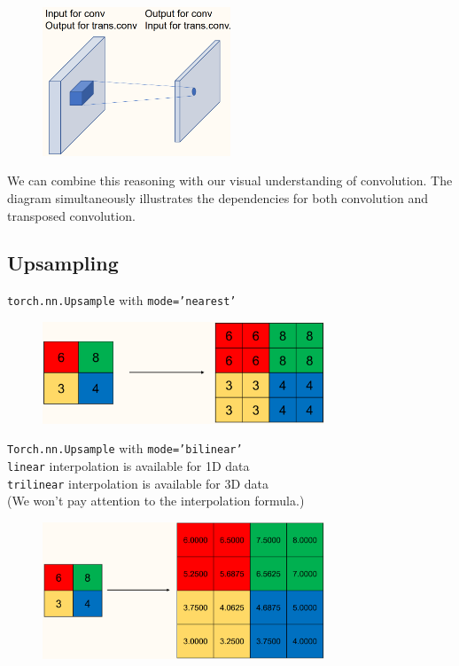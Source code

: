 \documentclass{report}
\begin{document}
\begin{figure}[H]
    \centering
    \includegraphics[width=0.5\textwidth]{.././assets/8.17.png}
\end{figure}

We can combine this reasoning with our visual understanding of convolution. The diagram simultaneously illustrates the dependencies for both convolution and transposed convolution.

\subsection{Upsampling}

\begin{concept}[8.17][Upsampling]
    \texttt{torch.nn.Upsample} with \texttt{mode='nearest'}

    \begin{figure}[H]
        \centering
        \includegraphics[width=0.75\textwidth]{.././assets/8.18.png}
    \end{figure}
\end{concept}

\begin{concept}[8.18][Upsampling]
    \texttt{Torch.nn.Upsample} with \texttt{mode='bilinear'}\\
    \texttt{linear} interpolation is available for 1D data\\
    \texttt{trilinear} interpolation is available for 3D data\\
    (We won't pay attention to the interpolation formula.)

    \begin{figure}[H]
        \centering
        \includegraphics[width=0.75\textwidth]{.././assets/8.19.png}
    \end{figure}
\end{concept}
\end{document}
